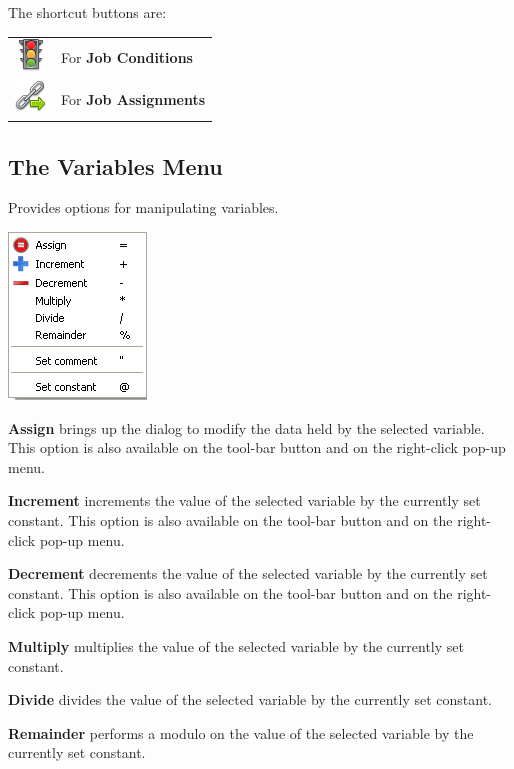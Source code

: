 The shortcut buttons are:

\begin{tabular}{l p{12cm}}
\includegraphics{img/btqwcond.png} & For \textbf{Job Conditions}\\
\includegraphics{img/btqwass.png} & For \textbf{Job Assignments}\\
\end{tabular}

\subsection{The Variables Menu}
Provides options for manipulating variables.

\includegraphics{img/btqwvarmenu.png} 

\textbf{Assign} brings up the dialog to modify the
data held by the selected variable. This option is also available on
the tool-bar button and on the right-click pop-up menu.

\textbf{Increment} increments the value of the selected variable by the
currently set constant. This option is also available on the tool-bar
button and on the right-click pop-up menu.

\textbf{Decrement} decrements the value of the selected variable by the
currently set constant. This option is also available on the tool-bar
button and on the right-click pop-up menu.

\textbf{Multiply }multiplies the value of the selected variable by the
currently set constant.

\textbf{Divide }divides the value of the selected variable by the
currently set constant.

\textbf{Remainder} performs a modulo on the value of the selected
variable by the currently set constant.

